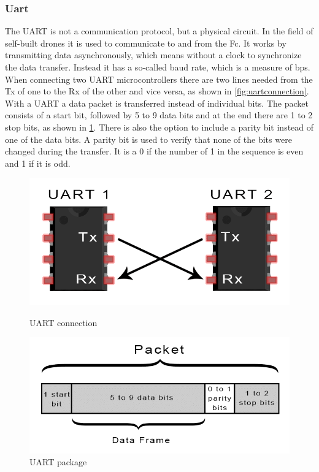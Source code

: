 \documentclass[svgnames]{article}
\begin{document}
	\subsubsection{Uart}
	The \gls{UART} is not a communication protocol, but a physical circuit. In the field of self-built drones it is used to communicate to and from the \gls{Fc}. It works by transmitting data asynchronously, which means without a clock to synchronize the data transfer. Instead it has a so-called baud rate, which is a measure of \gls{bps}. When connecting two \gls{UART} microcontrollers there are two lines needed from the Tx of one to the Rx of the other and vice versa, as shown in \cref{fig:uartconnection}. With a \gls{UART} a data packet is transferred instead of individual bits. The packet consists of a start bit, followed by 5 to 9 data bits and at the end there are 1 to 2 stop bits, as shown in \cref{fig:uartpackage}. There is also the option to include a parity bit instead of one of the data bits. A parity bit is used to verify that none of the bits were changed during the transfer. It is a 0 if the number of 1 in the sequence is even and 1 if it is odd.
	\cite{uartprotocol}
\begin{figure}[ht]
	\begin{minipage}[c]{0.4\textwidth}
		\includegraphics[width=\textwidth]{pictures/UARTconnection}
		\caption{\gls{UART} connection \cite{uartprotocol}}
		\label{fig:uartconnection}
	\end{minipage}
	\hfill
	\begin{minipage}[c]{0.4\textwidth}
		\includegraphics[width=\textwidth]{pictures/Uartpackage}
		\caption{\gls{UART} package \cite{uartprotocol}}
		\label{fig:uartpackage}
	\end{minipage}
	
\end{figure}
\end{document}
